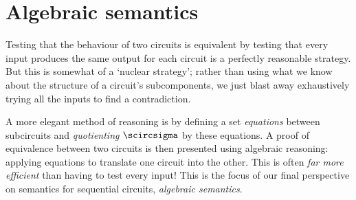 \chapter{Algebraic semantics}

Testing that the behaviour of two circuits is equivalent by testing that every
input produces the same output for each circuit is a perfectly reasonable
strategy.
But this is somewhat of a `nuclear strategy'; rather than using what we know
about the structure of a circuit's subcomponents, we just blast away
exhaustively trying all the inputs to find a contradiction.

A more elegant method of reasoning is by defining a set \emph{equations} between
subcircuits and \emph{quotienting} \(\scircsigma\) by these equations.
A proof of equivalence between two circuits is then presented using algebraic
reasoning: applying equations to translate one circuit into the other.
This is often \emph{far more efficient} than having to test every input!
This is the focus of our final perspective on semantics for sequential
circuits, \emph{algebraic semantics}.

